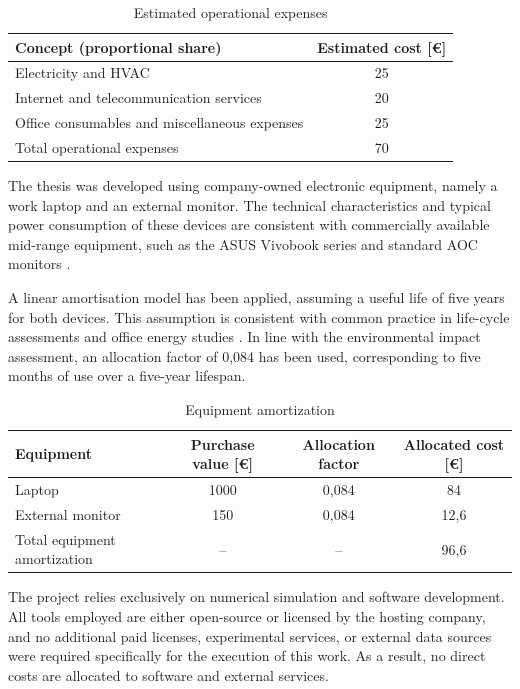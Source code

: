 \begin{table}[H]
\centering
\caption{Estimated operational expenses}
\renewcommand{\arraystretch}{1.15}
\small
\begin{tabular}{|l|c|}
\hline
\textbf{Concept (proportional share)} & \textbf{Estimated cost [€]} \\
\hline
Electricity and HVAC  & 25 \\
Internet and telecommunication services & 20 \\
Office consumables and miscellaneous expenses & 25 \\
\hline
Total operational expenses & 70 \\
\hline
\end{tabular}
\end{table}

The thesis was developed using company-owned electronic equipment, namely a work laptop and an external 
monitor. The technical characteristics and typical power consumption of these devices are consistent 
with commercially available mid-range equipment, such as the ASUS Vivobook series and standard AOC 
monitors \cite{AsusVivabook,AOC}.

A linear amortisation model has been applied, assuming a useful life of five years for both devices. 
This assumption is consistent with common practice in life-cycle assessments and office energy studies 
\cite{ADEME2023Offices,EEA2021OfficeEnergy}. In line with the environmental impact assessment, an allocation 
factor of 0,084 has been used, corresponding to five months of use over a five-year lifespan.

\begin{table}[H]
\centering
\caption{Equipment amortization}
\renewcommand{\arraystretch}{1.15}
\small
\begin{tabular}{|l|c|c|c|}
\hline
\textbf{Equipment} & \textbf{Purchase value [€]} & \textbf{Allocation factor} & \textbf{Allocated cost [€]} \\
\hline
Laptop & 1000 & 0,084 & 84 \\
External monitor & 150 & 0,084 & 12,6 \\
\hline
Total equipment amortization & -- & -- & 96,6 \\
\hline
\end{tabular}
\end{table}

The project relies exclusively on numerical simulation and software development. All tools employed are 
either open-source or licensed by the hosting company, and no additional paid licenses, experimental 
services, or external data sources were required specifically for the execution of this work. As a result, 
no direct costs are allocated to software and external services.

